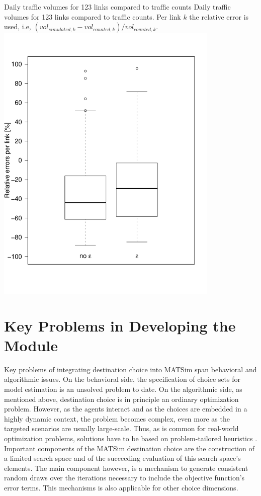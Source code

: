 \createfigure%
{Daily traffic volumes for 123 links compared to traffic counts}%
{Daily traffic volumes for 123 links compared to traffic counts. Per link $k$ the relative error is used, i.e, $(vol_{simulated,k}-vol_{counted,k}) / vol_{counted,k}$.}%
{\label{fig:countsLEGO}}%
{\includegraphics[width=0.8\textwidth, angle=0]{extending/figures/dc/zhCounts.pdf}}%
{}

\section{Key Problems in Developing the Module}
Key problems of integrating destination choice into MATSim span behavioral and algorithmic issues. On the behavioral side, the specification of choice sets for model estimation is an unsolved problem to date. On the algorithmic side, as mentioned above, destination choice is in principle an ordinary optimization problem. However, as the agents interact and as the choices are embedded in a highly dynamic context, the problem becomes complex, even more as the targeted scenarios are usually large-scale. Thus, as is common for real-world optimization problems, solutions have to be based on problem-tailored heuristics \citep[][]{MichalewiczFogel_2004}. Important components of the MATSim destination choice are the construction of a limited search space and of the succeeding evaluation of this search space's elements. The main component however, is a mechanism to generate consistent random draws over the iterations necessary to include the objective function's error terms. This mechanisms is also applicable for other choice dimensions.

